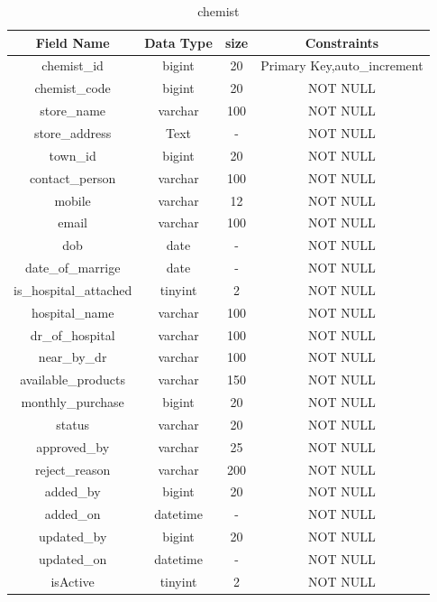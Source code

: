 \begin{table}[hp]
\centering
\begin{tabular}{|c|c|c|c|}
\hline
\textbf{Field Name}  & \textbf{Data Type}  & \textbf{size} &\textbf{Constraints}  \\
\hline
chemist\_id & bigint &	20 & Primary Key,auto\_increment\\
\hline
chemist\_code &	bigint & 20 & NOT NULL\\
\hline
store\_name	& varchar &	100 & NOT NULL\\
\hline
store\_address &	Text &	- & NOT NULL\\
\hline
town\_id & bigint & 	20 & NOT NULL\\
\hline
contact\_person & varchar & 100 & NOT NULL\\
\hline
mobile & varchar & 12 & NOT NULL\\
\hline
email &	varchar & 100 & NOT NULL\\
\hline
dob & date & - & NOT NULL\\
\hline
date\_of\_marrige & date & - & NOT NULL\\
\hline
is\_hospital\_attached & tinyint & 	2 & NOT NULL\\
\hline
hospital\_name &	varchar &	100 & NOT NULL\\
\hline
dr\_of\_hospital &	varchar &	100 & NOT NULL\\
\hline
near\_by\_dr & varchar &	100 & NOT NULL\\
\hline
available\_products &	varchar &	150 & NOT NULL\\
\hline
monthly\_purchase &	bigint & 20 & NOT NULL\\
\hline
status & varchar & 20 & NOT NULL\\
\hline
approved\_by & varchar &	25 & NOT NULL\\
\hline
reject\_reason & varchar & 200 & NOT NULL\\
\hline
added\_by &	bigint & 20 & NOT NULL\\
\hline
added\_on &	datetime &	- & NOT NULL\\
\hline
updated\_by & bigint &	20 & NOT NULL\\
\hline
updated\_on &	datetime &	- & NOT NULL\\
\hline
isActive &	tinyint &	2 & NOT NULL\\
\hline
\end{tabular}
\caption{chemist}
\end{table}


